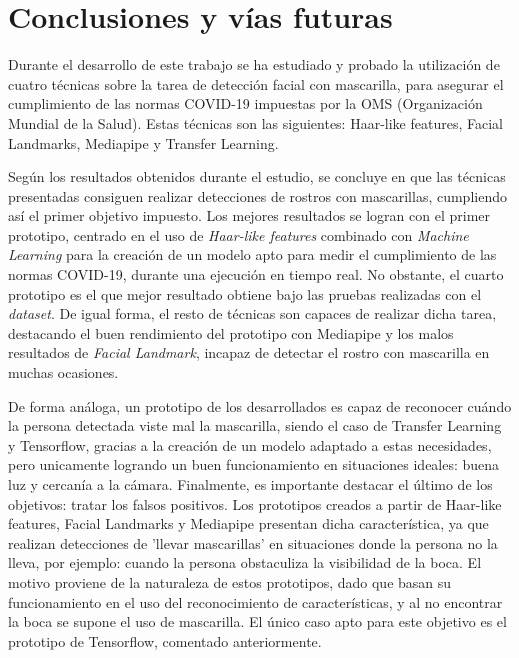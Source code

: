 
\chapter{Conclusiones y vías futuras}

Durante el desarrollo de este trabajo se ha estudiado y probado la utilización de cuatro técnicas sobre la tarea de detección facial con mascarilla, para asegurar el cumplimiento de las normas COVID-19 impuestas por la OMS (Organización Mundial de la Salud). Estas técnicas son las siguientes: Haar-like features, Facial Landmarks, Mediapipe y Transfer Learning.

Según los resultados obtenidos durante el estudio, se concluye en que las técnicas presentadas consiguen realizar detecciones de rostros con mascarillas, cumpliendo así el primer objetivo impuesto. Los mejores resultados se logran con el primer prototipo, centrado en el uso de \textit{Haar-like features} combinado con \textit{Machine Learning} para la creación de un modelo apto para medir el cumplimiento de las normas COVID-19, durante una ejecución en tiempo real. No obstante, el cuarto prototipo es el que mejor resultado obtiene bajo las pruebas realizadas con el \textit{dataset}. De igual forma, el resto de técnicas son capaces de realizar dicha tarea, destacando el buen rendimiento del prototipo con Mediapipe y los malos resultados de \textit{Facial Landmark}, incapaz de detectar el rostro con mascarilla en muchas ocasiones.

De forma análoga, un prototipo de los desarrollados es capaz de reconocer cuándo la persona detectada viste mal la mascarilla, siendo el caso de Transfer Learning y Tensorflow, gracias a la creación de un modelo adaptado a estas necesidades, pero unicamente logrando un buen funcionamiento en situaciones ideales: buena luz y cercanía a la cámara. Finalmente, es importante destacar el último de los objetivos: tratar los falsos positivos. Los prototipos creados a partir de Haar-like features, Facial Landmarks y Mediapipe presentan dicha característica, ya que realizan detecciones de 'llevar mascarillas' en situaciones donde la persona no la lleva, por ejemplo: cuando la persona obstaculiza la visibilidad de la boca. El motivo proviene de la naturaleza de estos prototipos, dado que basan su funcionamiento en el uso del reconocimiento de características, y al no encontrar la boca se supone el uso de mascarilla. El único caso apto para este objetivo es el prototipo de Tensorflow, comentado anteriormente.

